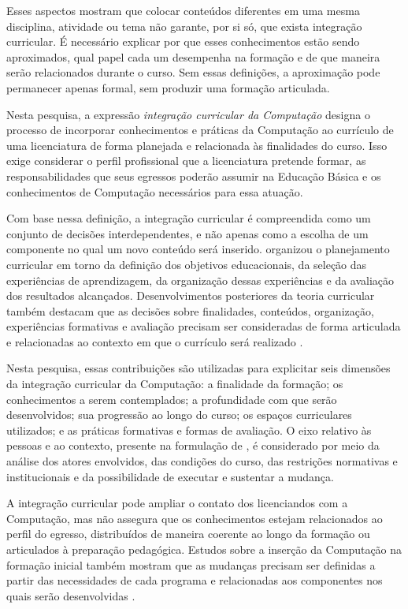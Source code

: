 Esses aspectos mostram que colocar conteúdos diferentes em uma mesma disciplina, atividade ou tema não garante, por si só, que exista integração curricular. É necessário explicar por que esses conhecimentos estão sendo aproximados, qual papel cada um desempenha na formação e de que maneira serão relacionados durante o curso. Sem essas definições, a aproximação pode permanecer apenas formal, sem produzir uma formação articulada.

Nesta pesquisa, a expressão \textit{integração curricular da Computação} designa o processo de incorporar conhecimentos e práticas da Computação ao currículo de uma licenciatura de forma planejada e relacionada às finalidades do curso. Isso exige considerar o perfil profissional que a licenciatura pretende formar, as responsabilidades que seus egressos poderão assumir na Educação Básica e os conhecimentos de Computação necessários para essa atuação.

Com base nessa definição, a integração curricular é compreendida como um conjunto de decisões interdependentes, e não apenas como a escolha de um componente no qual um novo conteúdo será inserido.  organizou o planejamento curricular em torno da definição dos objetivos educacionais, da seleção das experiências de aprendizagem, da organização dessas experiências e da avaliação dos resultados alcançados. Desenvolvimentos posteriores da teoria curricular também destacam que as decisões sobre finalidades, conteúdos, organização, experiências formativas e avaliação precisam ser consideradas de forma articulada e relacionadas ao contexto em que o currículo será realizado \cite{ornsteinhunkins2009curriculum,pacheco2001curriculo,gasparroldao2007elementos}.

Nesta pesquisa, essas contribuições são utilizadas para explicitar seis dimensões da integração curricular da Computação: a finalidade da formação; os conhecimentos a serem contemplados; a profundidade com que serão desenvolvidos; sua progressão ao longo do curso; os espaços curriculares utilizados; e as práticas formativas e formas de avaliação. O eixo relativo às pessoas e ao contexto, presente na formulação de , é considerado por meio da análise dos atores envolvidos, das condições do curso, das restrições normativas e institucionais e da possibilidade de executar e sustentar a mudança.

A integração curricular pode ampliar o contato dos licenciandos com a Computação, mas não assegura que os conhecimentos estejam relacionados ao perfil do egresso, distribuídos de maneira coerente ao longo da formação ou articulados à preparação pedagógica. Estudos sobre a inserção da Computação na formação inicial também mostram que as mudanças precisam ser definidas a partir das necessidades de cada programa e relacionadas aos componentes nos quais serão desenvolvidas \cite{margulieux2022integrating}.

